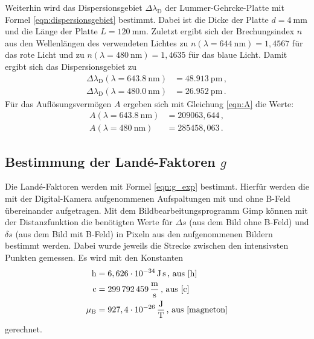 	Weiterhin wird das Dispersionsgebiet $\Delta \lambda_{\mathrm{D}}$ der
	Lummer-Gehrcke-Platte mit Formel
	\eqref{eqn:dispersionsgebiet} bestimmt. Dabei ist die Dicke der Platte $d=\SI{4}{\milli\meter}$
	und die Länge der Platte  $L = \SI{120}{\milli\meter}$. Zuletzt ergibt sich der
	Brechungsindex $n$ aus den Wellenlängen des verwendeten Lichtes zu
	$n(\lambda=\SI{644}{\nano\meter}) = 1,4567$ für das rote Licht und zu
	$n(\lambda=\SI{480}{\nano\meter}) = 1,4635$ für das blaue Licht. Damit ergibt sich
	das Dispersionsgebiet zu
	\begin{align*}
		\Delta \lambda_{\mathrm{D}}(\lambda=\SI{643.8}{\nano\meter}) &= \SI{48.913}{\pico\meter} \, \mathrm{,} \\
		\Delta \lambda_{\mathrm{D}}(\lambda=\SI{480.0}{\nano\meter}) &= \SI{26.952}{\pico\meter} \, \mathrm{.}
	\end{align*}
	Für das Auflösungsvermögen $A$ ergeben sich mit Gleichung \eqref{eqn:A} die Werte:
\begin{align*}
	A(\lambda=\SI{643.8}{\nano\meter}) &= 209063,644 \, \mathrm{,} \\
	A(\lambda=\SI{480}{\nano\meter}) &= 285458,063 \, \mathrm{.}
\end{align*}

\subsection{Bestimmung der Landé-Faktoren $g$}
	Die Landé-Faktoren werden mit Formel \eqref{eqn:g_exp} bestimmt. Hierfür werden die mit der
	Digital-Kamera aufgenommenen Aufspaltungen mit und ohne B-Feld übereinander aufgetragen.
	Mit dem Bildbearbeitungsprogramm Gimp \cite{gimp} können mit der Distanzfunktion
	die benötigten
	Werte für $\Delta s$ (aus dem Bild ohne B-Feld) und $\delta s$ (aus dem Bild mit B-Feld)
	in Pixeln aus den aufgenommenen Bildern bestimmt werden. Dabei wurde jeweils die
	Strecke zwischen den intensivsten Punkten gemessen.
	Es wird mit den Konstanten
	\begin{align*}
		\mathrm{h} &= 6,626 \cdot 10^{-34} \, \si{\joule\second} \, \text{, aus \cite{h}} \\
		\mathrm{c} &= \SI{299792459}{\meter\per\second}\, \text{, aus \cite{c}} \\
		\mu_{\mathrm{B}} &= 927,4 \cdot 10^{-26} \, \si{\joule\per\tesla} \, \text{, aus \cite{magneton}}
	\end{align*}
	gerechnet.
	\FloatBarrier
